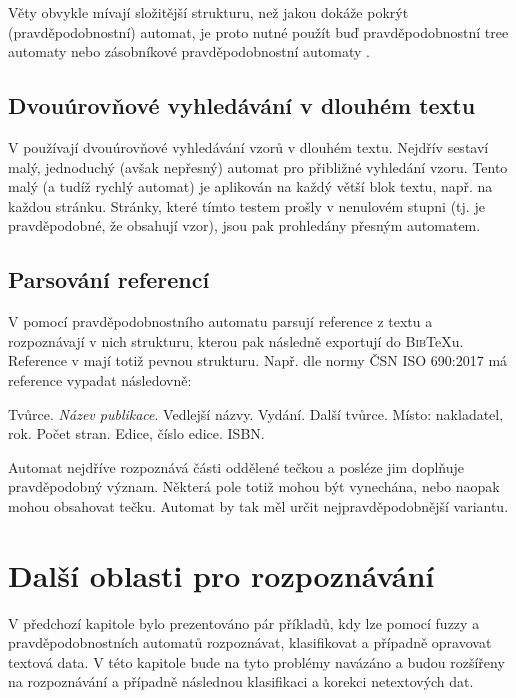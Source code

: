 Věty obvykle mívají složitější strukturu, než jakou dokáže pokrýt  (pravděpodobnostní) automat, je proto nutné použít buď pravděpodobnostní tree automaty \cite{KniGra-OvProTreTraNatLanPro} nebo zásobníkové pravděpodobnostní automaty \cite{WaMan-ProFiStMaRegBaMTEva}.

\subsection{Dvouúrovňové vyhledávání v dlouhém textu}

V \cite{Hun-NoLiTexSeaUsFuFiStLiNoDetAut} používají dvouúrovňové vyhledávání vzorů v dlouhém textu. Nejdřív sestaví malý, jednoduchý (avšak nepřesný) automat pro přibližné vyhledání vzoru. Tento malý (a tudíž rychlý automat) je aplikován na každý větší blok textu, např. na každou stránku. Stránky, které tímto testem prošly v nenulovém stupni (tj. je pravděpodobné, že obsahují vzor), jsou pak prohledány přesným automatem.

\subsection{Parsování referencí}
V \cite{Kra+-BibMeExUsiPrFiStTra} pomocí pravděpodobnostního automatu parsují reference z textu a rozpoznávají v nich strukturu, kterou pak následně exportují do \textsc{Bib}\TeX u. Reference v mají totiž pevnou strukturu. Např. dle normy ČSN ISO 690:2017\cite{web-CesCitNorm} má reference vypadat následovně:

Tvůrce. \textit{Název publikace}. Vedlejší názvy. Vydání. Další tvůrce. Místo: nakladatel, rok. Počet stran. Edice, číslo edice. ISBN.

Automat nejdříve rozpoznává části oddělené tečkou a posléze jim doplňuje pravděpodobný význam. Některá pole totiž mohou být vynechána, nebo naopak mohou obsahovat tečku. Automat by tak měl určit nejpravděpodobnější variantu.

\section{Další oblasti pro rozpoznávání}
V předchozí kapitole bylo prezentováno pár příkladů, kdy lze pomocí fuzzy a pravděpodobnostních automatů rozpoznávat, klasifikovat a případně opravovat textová data. V této kapitole bude na tyto problémy navázáno a budou rozšířeny na rozpoznávání a případně následnou klasifikaci a korekci netextových dat.

